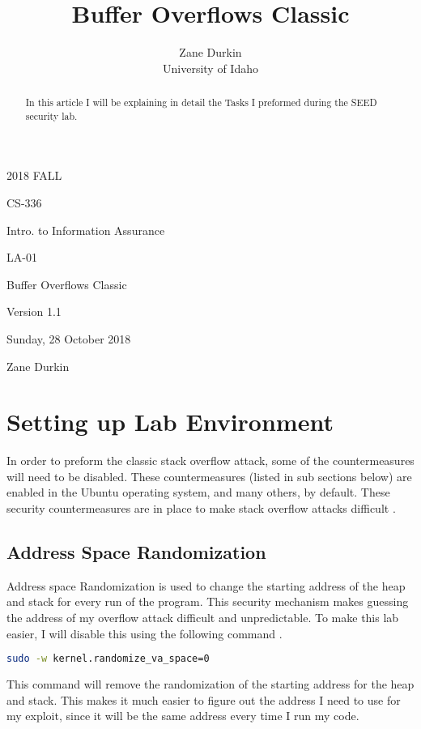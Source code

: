 \documentclass[14pt]{extarticle}
\begin{document}
\title{Buffer Overflows Classic}

\author{Zane Durkin\\
    University of Idaho}
\begin{description}[leftmargin=!, labelwidth=\widthof{\bfseries Author(s) Name(s)}]
\item [Year and Semester] 2018 FALL
\item [Course Number] CS-336
\item [Course Title] Intro. to Information Assurance
\item [Work Number] LA-01
\item [Work Name] Buffer Overflows Classic
\item [Work Version] Version 1.1
\item [Long Date] Sunday, 28 October 2018
\item [Author(s) Name(s)] Zane Durkin
\end{description}
\begin{abstract}
In this article I will be explaining in detail the Tasks I preformed during the SEED security lab.
\end{abstract}

\setcounter{section}{-1}
\section{Setting up Lab Environment}
In order to preform the classic stack overflow attack, some of the countermeasures will need to be disabled. These countermeasures (listed in sub sections below) are enabled in the Ubuntu operating system, and many others, by default. These security countermeasures are in place to make stack overflow attacks difficult \cite{seed-bof}.

\subsection{Address Space Randomization}
Address space Randomization is used to change the starting address of the heap and stack for every run of the program. This security mechanism makes guessing the address of my overflow attack difficult and unpredictable. To make this lab easier, I will disable this using the following command \cite{seed-bof}.
\begin{lstlisting}[language=sh]
	sudo -w kernel.randomize_va_space=0
\end{lstlisting}
This command will remove the randomization of the starting address for the heap and stack. This makes it much easier to figure out the address I need to use for my exploit, since it will be the same address every time I run my code.
\end{document}
